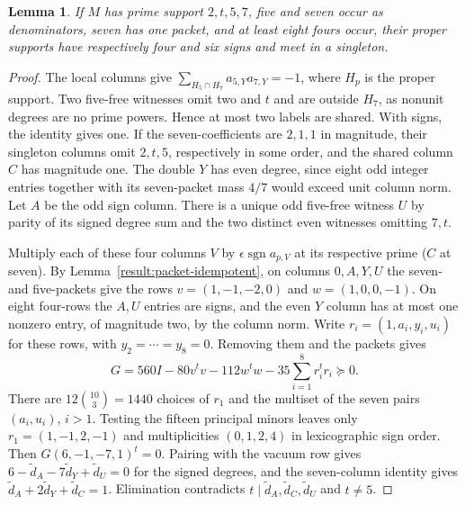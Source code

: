 \documentclass[11pt]{amsart}
\numberwithin{equation}{section}
\newtheorem{lemma}[theorem]{Lemma}
\theoremstyle{definition}
\theoremstyle{plain}
\begin{document}
\begin{lemma}
If $M$ has prime support $2,t,5,7$, five and seven occur as denominators,
seven has one packet, and at least eight fours occur, their proper
supports have respectively four and six signs and meet in a singleton.
\end{lemma}
\begin{proof}
The local columns give $\sum_{H_5\cap H_7}a_{5,Y}a_{7,Y}=-1$, where
$H_p$ is the proper support. Two five-free witnesses omit two and $t$
and are outside $H_7$, as nonunit degrees are no prime powers. Hence
at most two labels are shared. With signs, the identity gives one.
If the seven-coefficients are $2,1,1$ in magnitude, their singleton
columns omit $2,t,5$, respectively in some order, and the shared
column $C$ has magnitude one. The double $Y$ has even degree, since
eight odd integer entries together with its seven-packet mass $4/7$
would exceed unit column norm. Let $A$ be the odd sign column.
There is a unique odd five-free witness $U$ by parity of its signed
degree sum and the two distinct even witnesses omitting $7,t$.

Multiply each of these four columns $V$ by $\epsilon\operatorname{sgn}a_{p,V}$
at its respective prime ($C$ at seven). By Lemma~\ref{result:packet-idempotent},
on columns $0,A,Y,U$ the seven- and five-packets give the rows
$v=(1,-1,-2,0)$ and $w=(1,0,0,-1)$.
On eight four-rows the $A,U$ entries are signs, and the even $Y$
column has at most one nonzero entry, of magnitude two, by the column
norm. Write $r_i=(1,a_i,y_i,u_i)$ for these rows, with $y_2=\cdots=y_8=0$.
Removing them and the packets gives
\[
 G=560I-80v^tv-112w^tw-35\sum_{i=1}^8r_i^tr_i\succeq0.
\]
There are $12\binom{10}3=1440$ choices of $r_1$ and the multiset of
the seven pairs $(a_i,u_i)$, $i>1$. Testing the fifteen principal
minors leaves only $r_1=(1,-1,2,-1)$ and multiplicities $(0,1,2,4)$
in lexicographic sign order. Then $G(6,-1,-7,1)^t=0$. Pairing with the vacuum row gives
$6-\tilde d_A-7\tilde d_Y+\tilde d_U=0$ for the signed degrees,
and the seven-column identity gives $\tilde d_A+2\tilde d_Y+\tilde d_C=1$.
Elimination contradicts $t\mid\tilde d_A,\tilde d_C,\tilde d_U$ and
$t\ne5$.
\end{proof}
\end{document}
